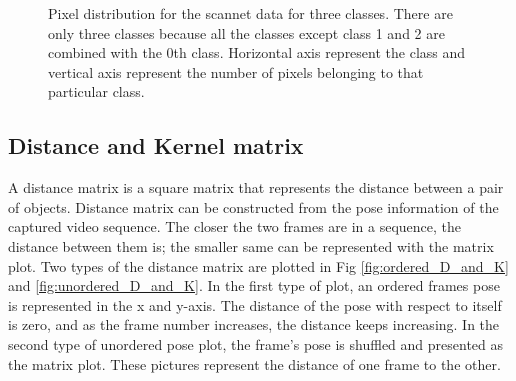    	\begin{figure}%
    	\centering
    	\qquad
    	\caption{Pixel distribution for the scannet data for three classes. There are only three classes because all the classes except class 1 and 2 are combined with the 0th class. Horizontal axis represent the class and vertical axis represent the number of pixels belonging to that particular class.}%
    	\label{fig:scannet_three_classes}%
    \end{figure}
    \subsection{Distance and Kernel matrix}
	
	A distance matrix is a square matrix that represents the distance between a pair of objects. Distance matrix can be constructed from the pose information of the captured video sequence. The closer the two frames are in a sequence, the distance between them is; the smaller same can be represented with the matrix plot. Two types of the distance matrix are plotted in Fig \ref{fig:ordered_D_and_K} and \ref{fig:unordered_D_and_K}. In the first type of plot, an ordered frames pose is represented in the x and y-axis. The distance of the pose with respect to itself is zero, and as the frame number increases, the distance keeps increasing. In the second type of unordered pose plot, the frame's pose is shuffled and presented as the matrix plot. These pictures represent the distance of one frame to the other. 
	
